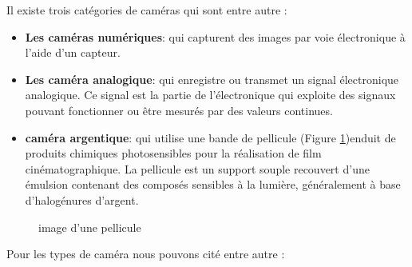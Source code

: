  Il existe trois catégories de caméras qui sont entre autre \cite{noauthor_camera_2024}:
 \begin{itemize}
 	\item \textbf{Les caméras numériques}: qui capturent des images par voie électronique à l’aide d’un capteur.
 	
 	\item \textbf{Les caméra analogique}: qui enregistre ou transmet un signal électronique analogique. 
 	Ce signal est la partie de l'électronique qui exploite des signaux pouvant fonctionner ou être mesurés par des valeurs continues. 
 	
 	\item\textbf{caméra argentique}: qui utilise une bande de pellicule (Figure \ref{fig:Pellicule})enduit de produits chimiques photosensibles pour la réalisation de film cinématographique.
 	La pellicule est un support souple recouvert d'une émulsion contenant des composés sensibles à la lumière, généralement à base d'halogénures d'argent.
 	
 \end{itemize}
 
 \begin{figure}[H]%
 	\center%
 	\setlength{\fboxsep}{5pt}%
 	\setlength{\fboxrule}{0.5pt}%
 	\caption[Pellicule]{image d'une pellicule}%
 	\label{fig:Pellicule}
 \end{figure}
 
 
 Pour les types de caméra nous pouvons cité entre autre \cite{noauthor_les_2015} :
 
